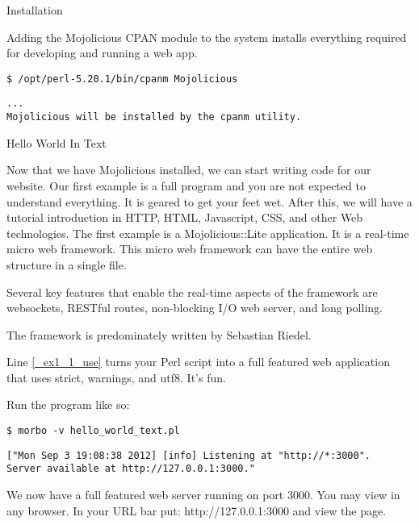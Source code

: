 \documentclass[14pt]{extreport}
\begin{document}
{\Large Installation}

Adding the Mojolicious CPAN module to the system installs everything required
for developing and running a web app.

\begin{lstlisting}[style=BashInputStyle]
$ /opt/perl-5.20.1/bin/cpanm Mojolicious
\end{lstlisting}

\begin{lstlisting}[style=BashOutputStyle]
...
Mojolicious will be installed by the cpanm utility.
\end{lstlisting}

{\Large Hello World In Text}

Now that we have Mojolicious installed, we can start writing code for our
website. Our first example is a full program and you are not expected to
understand everything. It is geared to get your feet wet. After this, we will
have a tutorial introduction in HTTP, HTML, Javascript, CSS, and other Web
technologies.  The first example is a Mojolicious::Lite application. It is a
real-time micro web framework. This micro web framework can have the entire web
structure in a single file.

Several key features that enable the real-time aspects of the framework are
websockets, RESTful routes, non-blocking I/O web server, and long polling.

The framework is predominately written by Sebastian Riedel.



Line \ref{_ex1_1_use} turns your Perl script into a full featured web
application that uses strict, warnings, and utf8. It's fun.

Run the program like so:

\begin{lstlisting}[style=BashInputStyle]
$ morbo -v hello_world_text.pl
\end{lstlisting}

\begin{lstlisting}[style=BashOutputStyle]
["Mon Sep 3 19:08:38 2012] [info] Listening at "http://*:3000".
Server available at http://127.0.0.1:3000."
\end{lstlisting}

We now have a full featured web server running on port 3000. You may view in
any browser. In your URL bar put: http://127.0.0.1:3000 and view the page.
\end{document}
